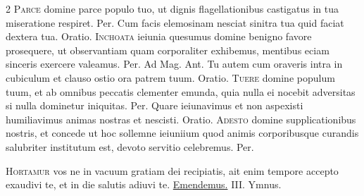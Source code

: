 \begin{multicols*}{2}
\lettrine[lines=2]{\zallmancaps \color{Red} P}{arce} domine parce populo tuo, ut dignis flagellationibus castigatus in tua miseratione respiret. Per.
 Cum facis elemosinam nesciat sinitra tua quid faciat dextera tua. {\color{Red} Oratio.}
\lettrine[lines=2]{\zallmancaps \color{Blue} I}{nchoata} ieiunia quesumus domine benigno favore prosequere, ut observantiam quam corporaliter exhibemus, mentibus eciam sinceris exercere valeamus. Per. {\color{Red} Ad Mag. Ant.} Tu autem cum oraveris intra in cubiculum et clauso ostio ora patrem tuum. {\color{Red} Oratio.}
\lettrine[lines=2]{\zallmancaps \color{Blue} T}{uere} domine populum tuum, et ab omnibus peccatis clementer emunda, quia nulla ei nocebit adversitas si nulla dominetur iniquitas. Per.
 Quare ieiunavimus et non aspexisti humiliavimus animas nostras et nescisti. {\color{Red} Oratio.}
\lettrine[lines=2]{\zallmancaps \color{Blue} A}{desto} domine supplicationibus nostris, et concede ut hoc sollemne ieiuniium quod animis corporibusque curandis salubriter institutum est, devoto servitio celebremus. Per.
{\color{Red} }
\par {}
\lettrine[lines=2]{\zallmancaps \color{Red} H}{ortamur} \hypertarget{hortamur-vos}{\label{hortamur-vos}} vos ne in vacuum gratiam dei recipiatis, ait enim tempore accepto exaudivi te, et in die salutis adiuvi te. \R \hyperlink{emendemus-in-melius}{Emendemus.} {\color{Red} III. Ymnus.}
\end{multicols*}
